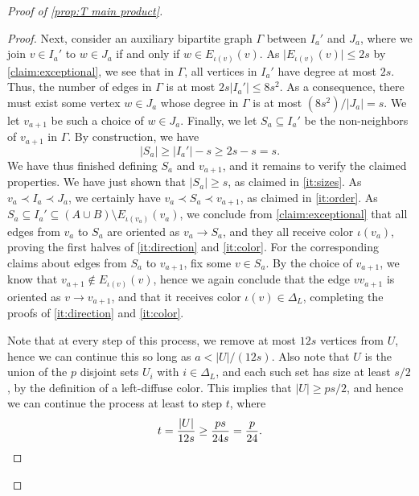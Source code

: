 \documentclass[10pt,a4paper]{amsart}
\newcommand\ab[1]{\lvert#1\rvert}
\begin{document}
\begin{proof}[Proof of \cref{prop:T main product}]
\begin{proof}
        Next, consider an auxiliary bipartite graph $\Gamma$ between $I_a'$ and $J_a$, where we join $v \in I_a'$ to $w \in J_a$ if and only if $w \in E_{\iota(v)}(v)$. As $\ab{E_{\iota(v)}(v)}\leq 2s$ by \cref{claim:exceptional}, we see that in $\Gamma$, all vertices in $I_a'$ have degree at most $2s$. Thus, the number of edges in $\Gamma$ is at most $2s\ab{I_a'} \leq 8s^2$. As a consequence, there must exist some vertex $w \in J_a$ whose degree in $\Gamma$ is at most $(8s^2)/\ab{J_a}=s$. We let $v_{a+1}$ be such a choice of $w \in J_a$. Finally, we let $S_a\subseteq I_a'$ be the non-neighbors of $v_{a+1}$ in $\Gamma$. By construction, we have
        \[
            \ab{S_a} \geq \ab{I_a'}-s \geq 2s-s=s.
        \]
        We have thus finished defining $S_a$ and $v_{a+1}$, and it remains to verify the claimed properties. We have just shown that $\ab{S_a}\geq s$, as claimed in \ref{it:sizes}. As $v_a \prec I_a \prec J_a$, we certainly have $v_a \prec S_a \prec v_{a+1}$, as claimed in \ref{it:order}. As $S_a \subseteq I_a' \subseteq (A\cup B) \setminus E_{\iota(v_a)}(v_a)$, we conclude from \cref{claim:exceptional} that all edges from $v_a$ to $S_a$ are oriented as $v_a \to S_a$, and they all receive color $\iota(v_a)$, proving the first halves of \ref{it:direction} and \ref{it:color}. For the corresponding claims about edges from $S_a$ to $v_{a+1}$, fix some $v \in S_a$. By the choice of $v_{a+1}$, we know that $v_{a+1} \notin E_{\iota(v)}(v)$, hence we again conclude that the edge $vv_{a+1}$ is oriented as $v \to v_{a+1}$, and that it receives color $\iota(v)\in \Delta_L$, completing the proofs of \ref{it:direction} and \ref{it:color}.

        Note that at every step of this process, we remove at most $12s$ vertices from $U$, hence we can continue this so long as $a<\ab U/(12s)$. Also note that $U$ is the union of the $p$ disjoint sets $U_i$ with $i \in \Delta_L$, and each such set has size at least $s/2$, by the definition of a left-diffuse color. This implies that $\ab U \geq ps/2$, and hence we can continue the process at least to step $t$, where
        \[
            t = \frac{\ab U}{12 s} \geq \frac{ps}{24s} = \frac{p}{24}.\qedhere
        \]
    \end{proof}




\end{proof}
\end{document}
